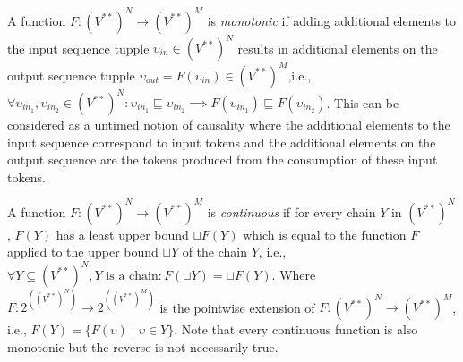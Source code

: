 A function $F: (V^{**})^N \to (V^{**})^M$ is \emph{monotonic} if
adding additional elements to the input sequence tupple $\upsilon_{in} \in (V^{**})^N$
results in additional elements on the output sequence tupple
$\upsilon_{out} = F(\upsilon_{in}) \in (V^{**})^M$,i.e.,
$\forall{\upsilon_{in_1}, \upsilon_{in_2} \in (V^{**})^N}:
\upsilon_{in_1} \sqsubseteq \upsilon_{in_2} \implies F(\upsilon_{in_1}) \sqsubseteq F(\upsilon_{in_2})$.
This can be considered as a untimed notion of causality
where the additional elements to the input sequence correspond
to input tokens and the additional elements on the output sequence
are the tokens produced from the consumption of these input tokens.

A function $F: (V^{**})^N \to (V^{**})^M$ is \emph{continuous} if
for every chain $Y$ in $(V^{**})^N$, $F(Y)$ has a least upper bound
$\sqcup F(Y)$ which is equal to the function $F$ applied to the
upper bound $\sqcup Y$ of the chain $Y$,
i.e., $\forall{Y \subseteq (V^{**})^N, Y\textrm{ is a chain}}: F(\sqcup Y) = \sqcup F(Y)$.
Where $F : 2^{\left( (V^{**})^N \right)} \to 2^{\left( (V^{**})^M \right)}$
is the pointwise extension of $F : (V^{**})^N \to (V^{**})^M$, i.e.,
$F(Y) = \{ F(\upsilon) \mid \upsilon \in Y\}$. Note that
every continuous function is also monotonic but the reverse
is not necessarily true.


